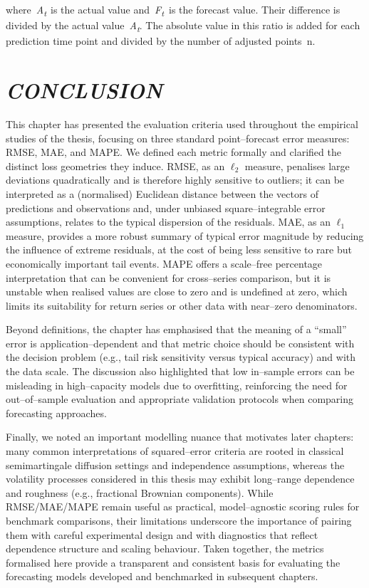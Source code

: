 \documentclass[12pt,a4paper]{report}
\numberwithin{equation}{section}
\begin{document}
where~\emph{A\textsubscript{t~}}is the actual value
and~\emph{F\textsubscript{t}}~is the forecast value. Their difference is
divided by the actual value~\emph{A\textsubscript{t}}. The absolute
value in this ratio is added for each prediction time point and divided
by the number of adjusted points~n.

\hypertarget{conclusion}{%
\section{\texorpdfstring{\emph{\textbf{CONCLUSION}}}{CONCLUSION}}\label{conclusion}}

This chapter has presented the evaluation criteria used throughout the empirical studies of the thesis, focusing on three standard point--forecast error measures: RMSE, MAE, and MAPE. We defined each metric formally and clarified the distinct loss geometries they induce. RMSE, as an $\ell_2$ measure, penalises large deviations quadratically and is therefore highly sensitive to outliers; it can be interpreted as a (normalised) Euclidean distance between the vectors of predictions and observations and, under unbiased square--integrable error assumptions, relates to the typical dispersion of the residuals. MAE, as an $\ell_1$ measure, provides a more robust summary of typical error magnitude by reducing the influence of extreme residuals, at the cost of being less sensitive to rare but economically important tail events. MAPE offers a scale--free percentage interpretation that can be convenient for cross--series comparison, but it is unstable when realised values are close to zero and is undefined at zero, which limits its suitability for return series or other data with near--zero denominators.

Beyond definitions, the chapter has emphasised that the meaning of a ``small'' error is application--dependent and that metric choice should be consistent with the decision problem (e.g., tail risk sensitivity versus typical accuracy) and with the data scale. The discussion also highlighted that low in--sample errors can be misleading in high--capacity models due to overfitting, reinforcing the need for out--of--sample evaluation and appropriate validation protocols when comparing forecasting approaches.

Finally, we noted an important modelling nuance that motivates later chapters: many common interpretations of squared--error criteria are rooted in classical semimartingale diffusion settings and independence assumptions, whereas the volatility processes considered in this thesis may exhibit long--range dependence and roughness (e.g., fractional Brownian components). While RMSE/MAE/MAPE remain useful as practical, model--agnostic scoring rules for benchmark comparisons, their limitations underscore the importance of pairing them with careful experimental design and with diagnostics that reflect dependence structure and scaling behaviour. Taken together, the metrics formalised here provide a transparent and consistent basis for evaluating the forecasting models developed and benchmarked in subsequent chapters.
\end{document}
